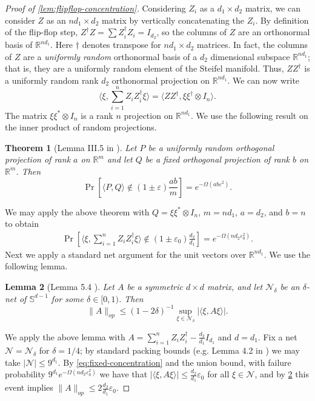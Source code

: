 \documentclass[aos]{imsart}
\newtheorem{theorem}{Theorem}[section]
\newtheorem{lemma}[theorem]{Lemma}
\theoremstyle{definition}
\numberwithin{equation}{section}
\newcommand{\R}{{\mathbb{R}}}
\renewcommand{\S}{\mathbb{S}}
\newcommand{\ot}{\otimes}
\newcommand{\eps}{\varepsilon}
\begin{document}
\begin{appendix}
\begin{proof}[Proof of \cref{lem:flipflop-concentration}]
 Considering $Z_i$ as a $d_1 \times d_2$ matrix, we can consider $Z$ as an $n d_1 \times d_2$ matrix by vertically concatenating the $Z_i$. By definition of the flip-flop step, $Z^\dagger Z = \sum Z_i^\dagger Z_i = I_{d_2}$, so the columns of $Z$ are an orthonormal basis of $\R^{n d_1}$. Here $\dagger$ denotes transpose for $nd_1 \times d_2$ matrices. In fact, the columns of $Z$ are a \emph{uniformly random} orthonormal basis of a $d_2$ dimensional subspace $\R^{n d_1}$; that is, they are a uniformly random element of the Steifel manifold. Thus, $Z Z^\dagger$ is a uniformly random rank $d_2$ orthonormal projection on $\R^{n d_1}$. We can now write
 $$ \langle \xi,  \sum_{i = 1}^n Z_i Z_i^{\dagger} \xi \rangle = \langle Z Z^\dagger,  \xi \xi^\dagger \ot I_{n} \rangle.$$
The matrix $\xi \xi^{*} \otimes I_{n}$ is a rank $n$ projection on $\R^{n d_1}$. We use the following result on the inner product of random projections.

\begin{theorem} [Lemma III.5 in \cite{hayden2006aspects}] Let $P$ be a uniformly random orthogonal projection of rank $a$ on $\R^{m}$ and let $Q$ be a fixed orthogonal projection of rank $b$ on $\R^{m}$. Then
\[ \Pr \left[ \langle P, Q \rangle \not\in (1 \pm \eps) \frac{ab}{m} \right] = e^{ - \Omega( ab \eps^{2} ) }.  \]
\end{theorem}
We may apply the above theorem with $Q = \xi \xi^{*} \otimes I_{n}$, $m = n d_1$, $a = d_2$, and $b = n$ to obtain
\begin{gather}\Pr\left[ \langle \xi,  \sum_{i = 1}^n Z_i Z_i^{\dagger} \xi \rangle \not\in (1 \pm \eps_0) \frac{d_2}{ d_1} \right] = e^{ - \Omega( n d_2 \eps_0^{2} ) }. \label{eq:fixed-concentration} \end{gather}
Next we apply a standard net argument for the unit vectors over $\R^{nd_1}$. We use the following lemma.
\begin{lemma}[Lemma 5.4 \cite{vershynin2010introduction}]\label{lem:versh-net} Let $A$ be a symmetric $d\times d$ matrix, and let $\mathcal{N}_\delta$ be an $\delta$-net of $\S^{d-1}$ for some $\delta \in [0,1)$. Then
$$\|A\|_{op} \leq (1 - 2 \delta)^{-1} \sup_{\xi \in \mathcal{N}_\delta} | \langle \xi, A \xi \rangle|.$$
\end{lemma}
We apply the above lemma with $A = \sum_{i = 1}^n Z_i Z_i^{\dagger} - \frac{d_2}{d_1} I_{d_1}$ and $d = d_1$.
Fix a net $\mathcal{N} = \mathcal{N}_\delta$ for $\delta = 1/4$; by standard packing bounds (e.g. Lemma 4.2 in \cite{vershynin2010introduction}) we may take $|\mathcal{N}| \leq 9^{d_1}$. By \cref{eq:fixed-concentration} and the union bound, with failure probability $9^{d_1} e^{- \Omega (n d_2 \eps_0^2)}$ we have that $|\langle \xi , A \xi \rangle| \leq \frac{d_2}{d_1} \eps_0$ for all $\xi \in \mathcal{N}$, and by \cref{lem:versh-net} this event implies $\|A\|_{op} \leq 2  \frac{d_2}{d_1} \eps_0$.


\end{proof}
\end{appendix}
\end{document}
